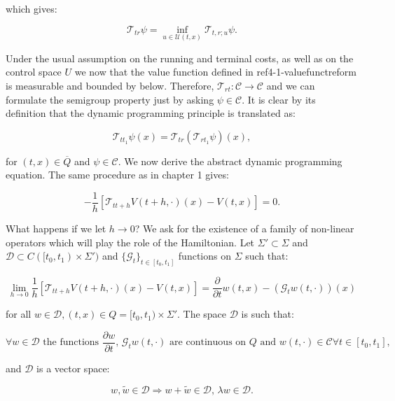which gives:

\begin{equation}\label{4-1-defofT_dynam}
    \mathcal{T}_{tr}\psi = \inf_{u\in\mathcal{U}(t,x)} \mathcal{T}_{t,r;u}\psi.
\end{equation}

Under the usual assumption on the running and terminal costs, as well as on the control space $U$ we now that the value function defined in ref{4-1-valuefunctreform} 
is measurable and bounded by below. Therefore, $\mathcal{T}_{rt}:\mathcal{C}\rightarrow\mathcal{C}$ and we can formulate the semigroup property just by asking $\psi\in\mathcal{C}$. 
It is clear by its definition that the dynamic programming principle is translated as:

\[\mathcal{T}_{tt_1}\psi(x)=\mathcal{T}_{tr}\left(\mathcal{T}_{rt_1}\psi\right)(x),\]

for $(t,x)\in\overline{Q}$ and $\psi\in\mathcal{C}$. We now derive the abstract dynamic programming equation. The same procedure as in chapter 1 gives:

\[-\frac{1}{h}\left[\mathcal{T}_{tt+h}V(t+h,\cdot)(x)-V(t,x)\right]=0.\]

What happens if we let $h\to0$? We ask for the existence of a family of non-linear operators which will play the role of the Hamiltonian. 
Let $\Sigma'\subset\Sigma$ and $\mathcal{D}\subset C([t_0,t_1)\times\Sigma')$ and $\{\mathcal{G}_t\}_{t\in[t_0,t_1]}$ functions on $\Sigma$ such that:

\begin{equation}\label{4-1-conditiononG_t}
    \lim_{h\to 0}\frac{1}{h}\left[\mathcal{T}_{tt+h}V(t+h,\cdot)(x)-V(t,x)\right] = \frac{\partial}{\partial t}w(t,x) - (\mathcal{G}_tw(t,\cdot))(x)
\end{equation}

for all $w\in\mathcal{D},(t,x)\in Q=[t_0,t_1)\times\Sigma'$. The space $\mathcal{D}$ is such that:

\begin{equation}\label{4-1-conditiononD}
    \forall w\in\mathcal{D} \text{ the functions }\frac{\partial w}{\partial t},\,\mathcal{G}_tw(t,\cdot) \text{ are continuous on $Q$ and }w(t,\cdot)\in\mathcal{C} \forall t\in[t_0,t_1], 
\end{equation}

and $\mathcal{D}$ is a vector space:

\begin{equation}
    w,\tilde{w}\in\mathcal{D} \Rightarrow w+\tilde{w}\in\mathcal{D},\,\lambda w\in\mathcal{D}.
\end{equation}

